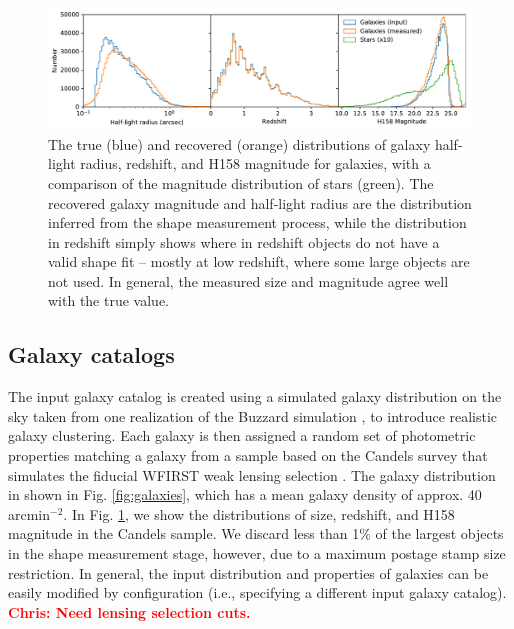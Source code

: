 \documentclass[aps,prd, amsmath,amssymb,superscriptaddress,showkeys,nofootinbib,reprint,preprintnumbers]{revtex4-1}
\newcommand{\verify}[1]{\textcolor{red}{\textbf{{#1}}}}
\begin{document}
\begin{figure}
\begin{center}
\includegraphics[width=\textwidth]{figures/hist.pdf}
\end{center}
\caption[]{
The true (blue) and recovered (orange) distributions of galaxy half-light radius, redshift, and H158 magnitude for galaxies, with a comparison of the magnitude distribution of stars (green). The recovered galaxy magnitude and half-light radius are the distribution inferred from the shape measurement process, while the distribution in redshift simply shows where in redshift objects do not have a valid shape fit -- mostly at low redshift, where some large objects are not used. In general, the measured size and magnitude agree well with the true value.
\label{fig:hist}}
\end{figure}

\subsection{Galaxy catalogs}\label{galcats}

The input galaxy catalog is created using a simulated galaxy distribution on the sky taken from one realization of the Buzzard simulation \cite{2019arXiv190102401D,wechsler2019}, to introduce realistic galaxy clustering. 
Each galaxy is then assigned a random set of photometric properties matching a galaxy from a sample based on the Candels survey that simulates the fiducial WFIRST weak lensing selection \cite{2019ApJ...877..117H}. 
The galaxy distribution in shown in Fig. \ref{fig:galaxies}, which has a mean galaxy density of approx. 40 arcmin$^{-2}$. 
In Fig. \ref{fig:hist}, we show the distributions of size, redshift, and H158 magnitude in the Candels sample. 
We discard less than 1\% of the largest objects in the shape measurement stage, however, due to a maximum postage stamp size restriction. 
In general, the input distribution and properties of galaxies can be easily modified by configuration (i.e., specifying a different input galaxy catalog).
\verify{Chris: Need lensing selection cuts.}
\end{document}
